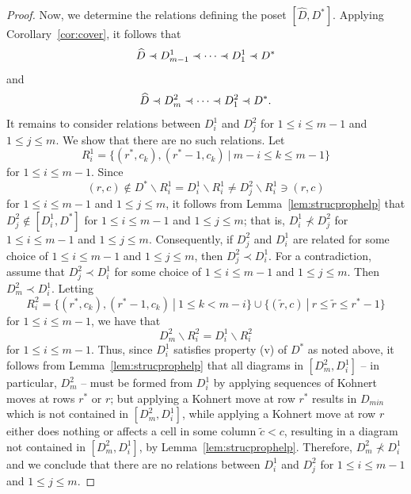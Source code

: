 \documentclass[letterpaper,10pt]{article}
\newcommand{\precdot}{\prec\mathrel{\mkern-5mu}\mathrel{\cdot}}
\begin{document}
\begin{proof}
Now, we determine the relations defining the poset $[\widehat{D},D^*]$. Applying Corollary~\ref{cor:cover}, it follows that $$\widehat{D}\precdot D^1_{m-1}\precdot\cdots\precdot D^1_1\precdot D^*$$ and $$\widehat{D}\precdot D^2_{m}\precdot\cdots\precdot D_1^2\precdot D^*.$$ It remains to consider relations between $D^1_i$ and $D_j^2$ for $1\le i\le m-1$ and $1\le j\le m$. We show that there are no such relations. Let $$R^1_i=\{(r^*,c_k),(r^*-1,c_k)~|~m-i\le k\le m-1\}$$ for $1\le i\le m-1$. Since $$(r,c)\notin D^*\backslash R^1_i=D^1_i\backslash R^1_i\neq D_j^2\backslash R^1_i\ni (r,c)$$ for $1\le i\le m-1$ and $1\le j\le m$, it follows from Lemma~\ref{lem:strucprophelp} that $D_j^2\notin [D^1_i,D^*]$ for $1\le i\le m-1$ and $1\le j\le m$; that is, $D^1_i\not\prec D_j^2$ for $1\le i\le m-1$ and $1\le j\le m$. Consequently, if $D_j^2$ and $D^1_i$ are related for some choice of $1\le i\le m-1$ and $1\le j\le m$, then $D_j^2\prec D^1_i$. For a contradiction, assume that $D_j^2\prec D^1_i$ for some choice of $1\le i\le m-1$ and $1\le j\le m$. Then $D_m^2\prec D^1_i$. Letting $$R^2_i=\{(r^*,c_k),(r^*-1,c_k)~|~1\le k< m-i\}\cup\{(\tilde{r},c)~|~r\le \tilde{r}\le r^*-1\}$$ for $1\le i\le m-1$, we have that $$D_m^2\backslash R^2_i=D^1_i\backslash R^2_i$$ for $1\le i\le m-1$. Thus, since $D^1_i$ satisfies property (v) of $D^*$ as noted above, it follows from Lemma~\ref{lem:strucprophelp} that all diagrams in $[D_m^2,D^1_i]$ -- in particular, $D_m^2$ -- must be formed from $D^1_i$ by applying sequences of Kohnert moves at rows $r^*$ or $r$; but applying a Kohnert move at row $r^*$ results in $D_{min}$ which is not contained in $[D_m^2,D^1_i]$, while applying a Kohnert move at row $r$ either does nothing or affects a cell in some column $\tilde{c}<c$, resulting in a diagram not contained in $[D_m^2,D^1_i]$, by Lemma~\ref{lem:strucprophelp}. Therefore, $D_m^2\not\prec D^1_i$ and we conclude that there are no relations between $D^1_i$ and $D_j^2$ for $1\le i\le m-1$ and $1\le j\le m$.


\end{proof}
\end{document}
